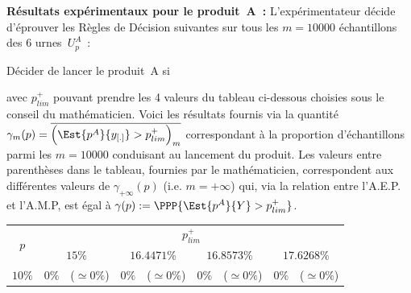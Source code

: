 \documentclass[10pt]{report}
\begin{document}
\begin{exercice}
\noindent \textbf{Résultats expérimentaux pour le produit~A~:}
L'expérimentateur décide d'éprouver les Règles de Décision suivantes sur tous les $m=10000$ échantillons des 6 urnes~$U^A_p$~:
\begin{center}
Décider de lancer le produit~A si 
\end{center} 
avec $p^+_{lim}$ pouvant prendre les 4 valeurs du tableau ci-dessous choisies sous le conseil du mathématicien. Voici les résultats fournis via la quantité $\gamma_m(p)=\overline{\Big(\Est{p^A}{y_{[.]}}>p^+_{lim}\Big)_m}$ correspondant à la proportion d'échantillons parmi les $m=10000$ conduisant au lancement du produit. Les valeurs entre parenthèses dans le tableau, fournies par le mathématicien, correspondent aux différentes valeurs de $\gamma_{+\infty}(p)$ (i.e. $m=+\infty$) qui, via la relation entre l'A.E.P. et l'A.M.P, est égal à $\gamma(p):=\PPP{\Est{p^A}{Y}>p^+_{lim}}$. 

\begin{center}
\begin{tabular}{|c|rl|rl|rl|rl|}\cline{1-9}
        \multirow{2}{*}{$p$}
         & 
    \multicolumn{8}{c|}{$p^+_{lim}$}
    
    
    
    
    
    
    
    \\ \cline{2-9}

    
        
         & 
    \multicolumn{2}{c|}{$15\%$}
     & 
    \multicolumn{2}{c|}{$16.4471\%$}
     & 
    \multicolumn{2}{c|}{$16.8573\%$}
     & 
    \multicolumn{2}{c|}{$17.6268\%$}
    
    \\ \cline{1-9}

    
        $10\%$
         & 
    
        $0\%$
         & 
    
        ($\simeq0\%$)
         & 
    
        $0\%$
         & 
    
        ($\simeq0\%$)
         & 
    
        $0\%$
         & 
    
        ($\simeq0\%$)
         & 
    
        $0\%$
         & 
    
        ($\simeq0\%$)
        
    \\ 


\end{tabular}
\end{center}
\end{exercice}
\end{document}

